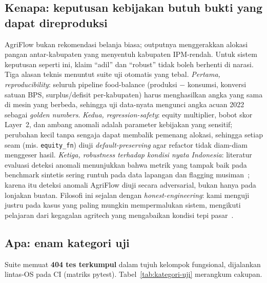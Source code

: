 \documentclass[11pt,a4paper]{article}
\newcommand{\code}[1]{\texttt{#1}}
\begin{document}
\subsection{Kenapa: keputusan kebijakan butuh bukti yang dapat direproduksi}
AgriFlow bukan rekomendasi belanja biasa; outputnya menggerakkan alokasi pangan
antar-kabupaten yang menyentuh kabupaten IPM-rendah. Untuk sistem keputusan
seperti ini, klaim ``adil'' dan ``robust'' tidak boleh berhenti di narasi. Tiga
alasan teknis menuntut suite uji otomatis yang tebal. \emph{Pertama,
reproducibility}: seluruh pipeline food-balance (produksi $-$ konsumsi, konversi
satuan BPS, surplus/defisit per-kabupaten) harus menghasilkan angka yang sama di
mesin yang berbeda, sehingga uji data-nyata mengunci angka acuan 2022 sebagai
\emph{golden numbers}. \emph{Kedua, regression-safety}: equity multiplier,
bobot skor Layer~2, dan ambang anomali adalah parameter kebijakan yang sensitif;
perubahan kecil tanpa sengaja dapat membalik pemenang alokasi, sehingga setiap
seam (mis. \code{equity\_fn}) diuji \emph{default-preserving} agar refactor tidak
diam-diam menggeser hasil. \emph{Ketiga, robustness terhadap kondisi nyata
Indonesia}: literatur evaluasi deteksi anomali menunjukkan bahwa metrik yang
tampak baik pada benchmark sintetis sering runtuh pada data lapangan dan
flagging musiman~\cite{liu2024}; karena itu deteksi anomali AgriFlow diuji
secara adversarial, bukan hanya pada lonjakan buatan. Filosofi ini sejalan dengan
\emph{honest-engineering}: kami menguji justru pada kasus yang paling mungkin
mempermalukan sistem, mengikuti pelajaran dari kegagalan agritech yang
mengabaikan kondisi tepi pasar~\cite{tanihub}.

\subsection{Apa: enam kategori uji}
Suite memuat \textbf{404 tes terkumpul} dalam tujuh kelompok fungsional, dijalankan
lintas-OS pada CI (matriks pytest). Tabel~\ref{tab:kategori-uji} merangkum cakupan.
\end{document}
